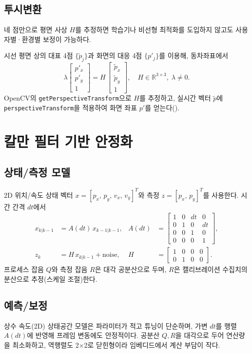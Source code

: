 \documentclass[10pt,a4paper]{article}
\begin{document}
\subsection{투시변환}
네 점만으로 평면 사상 $H$를 추정하면 학습기나 비선형 최적화를 도입하지 않고도 사용자별·환경별 보정이 가능하다.

시선 평면 상의 대표 4점 $\{\tilde{p}_j\}$과 화면의 대응 4점 $\{p'_j\}$를 이용해, 동차좌표에서
\begin{equation}
  \lambda \begin{bmatrix} p'_x \\ p'_y \\ 1 \end{bmatrix} =
  H\, \begin{bmatrix} \tilde{p}_x \\ \tilde{p}_y \\ 1 \end{bmatrix},\quad H\in\mathbb{R}^{3\times3},\;\lambda\neq 0.
\end{equation}
OpenCV의 \texttt{getPerspectiveTransform}으로 $H$를 추정하고, 실시간 벡터 $\tilde{p}$에 \texttt{perspectiveTransform}을 적용하여 화면 좌표 $p'$를 얻는다(\cite{HartleyZisserman2004}).

\section{칼만 필터 기반 안정화}
\subsection{상태/측정 모델}
2D 위치/속도 상태 벡터 $x=[p_x,\,p_y,\,v_x,\,v_y]^T$와 측정 $z=[p_x,\,p_y]^T$를 사용한다. 시간 간격 $dt$에서
\begin{align}
  x_{k|k-1} &= A(dt)\,x_{k-1|k-1}, & A(dt) &= \begin{bmatrix}1&0&dt&0\\0&1&0&dt\\0&0&1&0\\0&0&0&1\end{bmatrix},\\
  z_k &= H\,x_{k|k-1} + \text{noise}, & H &= \begin{bmatrix}1&0&0&0\\0&1&0&0\end{bmatrix}.
\end{align}
프로세스 잡음 $Q$와 측정 잡음 $R$은 대각 공분산으로 두며, $R$은 캘리브레이션 수집치의 분산으로 추정(스케일 조절)한다.

\subsection{예측/보정}
상수 속도(2D) 상태공간 모델은 파라미터가 적고 튜닝이 단순하며, 가변 $dt$를 행렬 $A(dt)$에 반영해 프레임 변동에도 안정적이다. 공분산 $Q,R$을 대각으로 두어 연산량을 최소화하고, 역행렬도 2×2로 닫힌형이라 임베디드에서 계산 부담이 작다.
\end{document}
